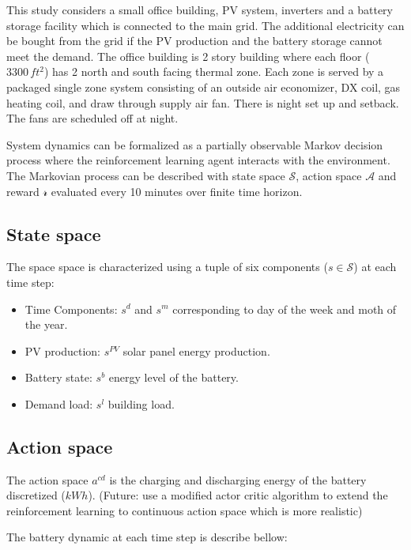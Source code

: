\documentclass[journal]{IEEEtran}
\begin{document}
This study considers a small office building, PV system, inverters and a
battery storage facility which is connected to the main grid. The
additional electricity can be bought from the grid if the PV production
and the battery storage cannot meet the demand. The office building is 2
story building where each floor (\(3300 \, ft^2\)) has 2 north and south
facing thermal zone. Each zone is served by a packaged single zone
system consisting of an outside air economizer, DX coil, gas heating
coil, and draw through supply air fan. There is night set up and
setback. The fans are scheduled off at night.

System dynamics can be formalized as a partially observable Markov
decision process where the reinforcement learning agent interacts with
the environment. The Markovian process can be described with state space
\(\mathcal{S}\), action space \(\mathcal{A}\) and reward \(\mathcal{r}\)
evaluated every 10 minutes over finite time horizon.

\subsection{State space}\label{state-space}

The space space is characterized using a tuple of six components
(\(s \in \mathcal{S}\)) at each time step:

\begin{itemize}
\item
  Time Components: \(s^d\) and \(s^m\) corresponding to day of the week
  and moth of the year.
\item
  PV production: \(s^{PV}\) solar panel energy production.
\item
  Battery state: \(s^b\) energy level of the battery.
\item
  Demand load: \(s^l\) building load.
\end{itemize}

\subsection{Action space}\label{action-space}

The action space \(a^{cd}\) is the charging and discharging energy of
the battery discretized (\(kWh\)). (Future: use a modified actor critic
algorithm to extend the reinforcement learning to continuous action
space which is more realistic)

The battery dynamic at each time step is describe bellow:
\end{document}
